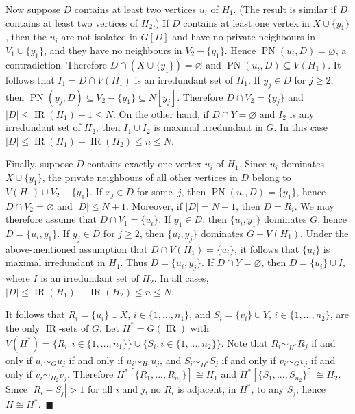 \documentclass[12pt]{article}%
\begin{document}
Now suppose $D$ contains at least two vertices $u_{i}$ of $H_{1}$. (The result
is similar if $D$ contains at least two vertices of $H_{2}$.) If $D$ contains
at least one vertex in $X\cup\{y_{1}\}$, then the $u_{i}$ are not isolated in
$G[D]$ and have no private neighbours in $V_{1}\cup\{y_{1}\}$, and they have
no neighbours in $V_{2}-\{y_{1}\}$. Hence $\operatorname{PN}(u_{i}%
,D)=\varnothing$, a contradiction. Therefore $D\cap(X\cup\{y_{1}%
\})=\varnothing$ and $\operatorname{PN}(u_{i},D)\subseteq V(H_{1})$. It
follows that $I_{1}=D\cap V(H_{1})$ is an irredundant set of $H_{1}$. If
$y_{j}\in D$ for $j\geq2$, then $\operatorname{PN}(y_{j},D)\subseteq
V_{2}-\{y_{1}\}\subseteq N[y_{j}]$. Therefore $D\cap V_{2}=\{y_{j}\}$ and
$|D|\leq\operatorname{IR}(H_{1})+1\leq N$. On the other hand, if $D\cap
Y=\varnothing$ and $I_{2}$ is any irredundant set of $H_{2}$, then $I_{1}\cup
I_{2}$ is maximal irredundant in $G$. In this case $|D|\leq\operatorname{IR}%
(H_{1})+\operatorname{IR}(H_{2})\leq n\leq N$.

Finally, suppose $D$ contains exactly one vertex $u_{i}$ of $H_{1}$. Since
$u_{i}$ dominates $X\cup\{y_{1}\}$, the private neighbours of all other
vertices in $D$ belong to $V(H_{1})\cup V_{2}-\{y_{1}\}$. If $x_{j}\in D$ for
some~$j$, then $\operatorname{PN}(u_{i},D)=\{y_{1}\}$, hence $D\cap
V_{2}=\varnothing$ and $|D|\leq N+1$. Moreover, if $|D|=N+1$, then $D=R_{i}$.
We may therefore assume that $D\cap V_{1}=\{u_{i}\}$. If $y_{1}\in D$, then
$\{u_{i},y_{1}\}$ dominates $G$, hence $D=\{u_{i},y_{1}\}$. If $y_{j}\in D$
for $j\geq2$, then $\{u_{i},y_{j}\}$ dominates $G-V(H_{1})$. Under the
above-mentioned assumption that $D\cap V(H_{1})=\{u_{i}\}$, it follows that
$\{u_{i}\}$ is maximal irredundant in $H_{1}$. Thus $D=\{u_{i},y_{j}\}$. If
$D\cap Y=\varnothing$, then $D=\{u_{i}\}\cup I$, where $I$ is an irredundant
set of $H_{2}$. In all cases, $|D|\leq\operatorname{IR}(H_{1}%
)+\operatorname{IR}(H_{2})\leq n\leq N$.

It follows that $R_{i}=\{u_{i}\}\cup X$, $i\in\{1,...,n_{1}\}$, and
$S_{i}=\{v_{i}\}\cup Y$, $i\in\{1,...,n_{2}\}$, are the only
$\operatorname{IR}$-sets of $G$. Let $H^{\ast}=G(\operatorname{IR})$ with
$V(H^{\ast})=\{R_{i}:i\in\{1,...,n_{1}\}\}\cup\{S_{i}:i\in\{1,...,n_{2}\}\}$.
Note that $R_{i}\sim_{H^{\ast}}R_{j}$ if and only if $u_{i}\sim_{G}u_{j}$ if
and only if $u_{i}\sim_{H_{1}}u_{j}$, and $S_{i}\sim_{H^{\ast}}S_{j}$ if and
only if $v_{i}\sim_{G}v_{j}$ if and only if $v_{i}\sim_{H_{2}}v_{j}$.
Therefore $H^{\ast}[\{R_{1},...,R_{n_{1}}\}]\cong H_{1}$ and $H^{\ast}%
[\{S_{1},...,S_{n_{2}}\}]\cong H_{2}$. Since $|R_{i}-S_{j}|>1$ for all $i$ and
$j$, no $R_{i}$ is adjacent, in $H^{\ast}$, to any $S_{j}$; hence $H\cong
H^{\ast}$.~$\blacksquare$
\end{document}
